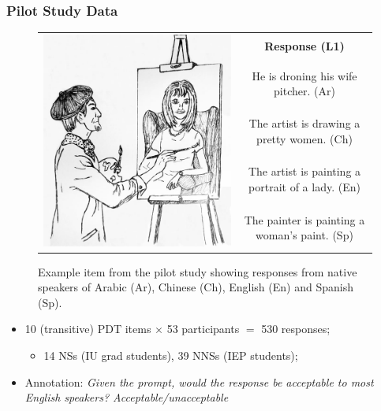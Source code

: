 \documentclass[handout,xcolor={dvipsnames}]{beamer}
\begin{document}
\begin{frame}
\frametitle{Pilot Study Data}
\begin{small}
\begin{figure}[htb!]
\begin{center}
\bgroup
\def\arraystretch{1.45}
\begin{tabular}{|c|c|}
\hline
\multirow{5}{*}{\includegraphics[trim=0 50 0 20,clip,width=0.28\columnwidth]{figures/exampleprompt.jpg}} &
\textbf{Response (L1)} \\
\cline{2-2}
& He is droning his wife pitcher. (Ar) \\
\cline{2-2}
& The artist is drawing a pretty women. (Ch) \\
\cline{2-2}
& The artist is painting a portrait of a lady. (En) \\
\cline{2-2}
& The painter is painting a woman's paint. (Sp) \\
\hline
\end{tabular}
\egroup
\end{center}
\caption{Example item from the pilot study showing responses from native speakers of Arabic (Ar), Chinese (Ch), English (En) and Spanish (Sp).}
\label{fig:example-picture}
\end{figure}
\end{small}
\vspace{-1em}
\pause
\begin{itemize}
\item 10 (transitive) PDT items $\times$ 53 participants $=$ 530 responses;
\pause
\begin{itemize}
\item 14 NSs (IU grad students), 39 NNSs (IEP students);
\end{itemize}
\pause
\item Annotation: \textit{Given the prompt, would the response be acceptable to most English speakers? Acceptable/unacceptable}
\begin{itemize}

\end{itemize}
\end{itemize}
\end{frame}
\end{document}

